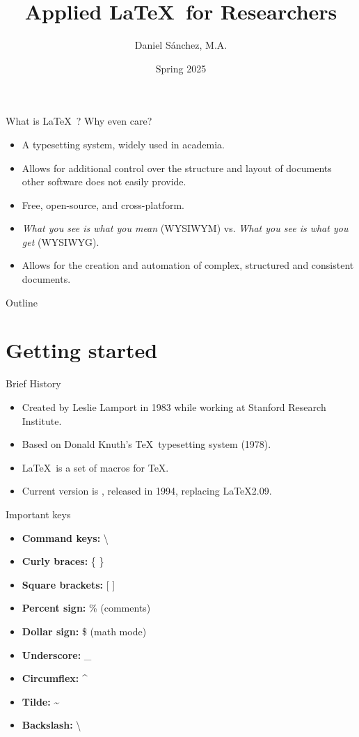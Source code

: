 \documentclass[t,12pt,xcolor=dvipsnames]{beamer}
\title[Applied \LaTeX]{Applied \LaTeX \ for Researchers}
\author{Daniel Sánchez, M.A.}
\institute[LIDE]{Laboratorio de Investigación para el Desarrollo del Ecuador}
\date{Spring 2025}
\begin{document}
\begin{frame}
    \titlepage
\end{frame}

\begin{frame}{What is \LaTeX \ ? Why even care?}
    \begin{itemize}
    \item A typesetting system, widely used in academia.
    \item Allows for additional control over the structure and layout of documents other software does not easily provide.
    \item Free, open-source, and cross-platform.
    \item \textit{What you see is what you mean} (WYSIWYM) vs. \textit{What you see is what you get} (WYSIWYG). %
    \item Allows for the creation and automation of complex, structured and consistent documents.
    \end{itemize}
\end{frame}

\begin{frame}{Outline}
    \tableofcontents
\end{frame}

\section{Getting started}

\begin{frame}{Brief History}
    \begin{itemize}
        \item Created by Leslie Lamport in 1983 while working at Stanford Research Institute.
        \item Based on Donald Knuth's \TeX \ typesetting system (1978).
        \item \LaTeX \ is a set of macros for \TeX.
        \item Current version is \LaTeXe, released in 1994, replacing \LaTeX 2.09.
    \end{itemize}
\end{frame}

\begin{frame}{Important keys}
    \begin{itemize}
        \item \textbf{Command keys:} \textbackslash
        \item \textbf{Curly braces:} \{ \}
        \item \textbf{Square brackets:} [ ]
        \item \textbf{Percent sign:} \% (comments)
        \item \textbf{Dollar sign:} \$ (math mode)
        \item \textbf{Underscore:} \_
        \item \textbf{Circumflex:} \^{}
        \item \textbf{Tilde:} \~{}
        \item \textbf{Backslash:} \textbackslash
\end{itemize}
\end{frame}
\end{document}

